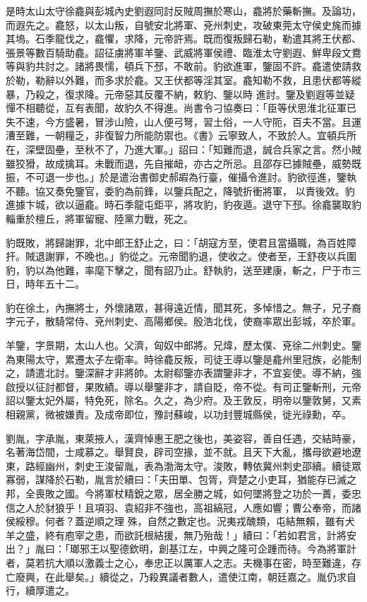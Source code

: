 \begin{pinyinscope}
 是時太山太守徐龕與彭城內史劉遐同討反賊周撫於寒山，龕將於藥斬撫。及論功，而遐先之。龕怒，以太山叛，自號安北將軍、兗州刺史，攻破東莞太守侯史旄而據其塢。石季龍伐之，龕懼，求降，元帝許焉。既而復叛歸石勒，勒遣其將王伏都、張景等數百騎助龕。詔征虜將軍羊鑒、武威將軍侯禮、臨淮太守劉遐、鮮卑段文鴦等與豹共討之。諸將畏懦，頓兵下邳，不敢前。豹欲進軍，鑒固不許。龕遣使請救於勒，勒辭以外難，而多求於龕。又王伏都等淫其室。龕知勒不救，且患伏都等縱暴，乃殺之，復求降。元帝惡其反覆不納，敕豹、鑒以時
 進討。鑒及劉遐等並疑憚不相聽從，互有表聞，故豹久不得進。尚書令刁協奏曰：「臣等伏思淮北征軍已失不速，今方盛暑，冒涉山險，山人便弓弩，習土俗，一人守阨，百夫不當。且運漕至難，一朝糧乏，非復智力所能防禦也。《書》云寧致人，不致於人。宜頓兵所在，深壁固壘，至秋不了，乃進大軍。」詔曰：「知難而退，誠合兵家之言。然小賊雖狡猾，故成擒耳。未戰而退，先自摧衄，亦古之所忌。且邵存已據賊壘，威勢既振，不可退一步也。」於是遣治書御史郝嘏為行臺，催攝令進討。豹欲徑進，鑒執不聽。協又奏免鑒官，委豹為前鋒，以鑒兵配之，降號折衝將軍，
 以責後效。豹進據卞城，欲以逼龕。時石季龍屯鉅平，將攻豹，豹夜遁。退守下邳。徐龕襲取豹輜重於檀丘，將軍留寵、陸黨力戰，死之。



 豹既敗，將歸謝罪，北中郎王舒止之，曰：「胡寇方至，使君且當攝職，為百姓障扞。賊退謝罪，不晚也。」豹從之。元帝聞豹退，使收之。使者至，王舒夜以兵圍豹，豹以為他難，率麾下擊之，聞有詔乃止。舒執豹，送至建康，斬之，尸于市三日，時年五十二。



 豹在徐土，內撫將士，外懷諸眾，甚得遠近情，聞其死，多悼惜之。無子，兄子裔字元子，散騎常侍、兗州刺史、高陽鄉侯。殷浩北伐，使裔率眾出彭城，卒於軍。



 羊鑒，字景期，太山人也。父濟，匈奴中郎將。兄煒，歷太僕、兗徐二州刺史。鑒為東陽太守，累遷太子左衛率。時徐龕反叛，司徒王導以鑒是龕州里冠族，必能制之，請遣北討。鑒深辭才非將帥。太尉郗鑒亦表謂鑒非才，不宜妄使。導不納，強啟授以征討都督，果敗績。導以舉鑒非才，請自貶，帝不從。有司正鑒斬刑，元帝詔以鑒太妃外屬，特免死，除名。久之，為少府。及王敦反，明帝以鑒敦舅，又素相親黨，微被嫌責。及成帝即位，豫討蘇峻，以功封豐城縣侯，徙光祿勳，卒。



 劉胤，字承胤，東萊掖人，漢齊悼惠王肥之後也，美姿容，善自任遇，交結時豪，名著海岱間，士咸慕之。舉賢良，辟司空掾，並不就。且天下大亂，攜母欲避地遼東，路經幽州，刺史王浚留胤，表為渤海太守。浚敗，轉依冀州刺史邵續。續徒眾寡弱，謀降於石勒，胤言於續曰：「夫田單、包胥，齊楚之小吏耳，猶能存已滅之邦，全喪敗之國。今將軍杖精銳之眾，居全勝之城，如何墜將登之功於一蕢，委忠信之人於豺狼乎！且項羽、袁紹非不強也，高祖縞冠，人應如響；曹公奉帝，而諸侯綏穆。何者？蓋逆順之理
 殊，自然之數定也。況夷戎醜類，屯結無賴，雖有犬羊之盛，終有庖宰之患，而欲託根結援，無乃殆哉！」續曰：「若如君言，計將安出？」胤曰：「瑯邪王以聖德欽明，創基江左，中興之隆可企踵而待。今為將軍計者，莫若抗大順以激義士之心，奉忠正以厲軍人之志。夫機事在密，時至難違，存亡廢興，在此舉矣。」續從之，乃殺異議者數人，遣使江南，朝廷嘉之。胤仍求自行，續厚遣之。




\end{pinyinscope}
